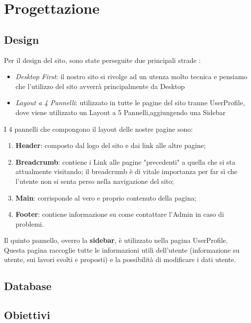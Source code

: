 \section{Progettazione}
	
  \subsection{Design}
  Per il design del sito, sono state perseguite due principali strade :
  \begin{itemize}
    \item \textit{Desktop First}: il nostro sito si rivolge ad un utenza molto tecnica e pensiamo che l'utilizzo del sito avverrà principalmente da Desktop
    \item \textit{Layout a 4 Pannelli}: utilizzato in tutte le pagine del sito tranne UserProfile, dove viene utilizzato un Layout a 5 Pannelli,aggiungendo una Sidebar
  \end{itemize}
  
  I 4 pannelli che compongono il layout delle nostre pagine sono:
  \begin{enumerate}
    \item \textbf{Header}: composto dal logo del sito e dai link alle altre pagine;
    \item \textbf{Breadcrumb}: contiene i Link alle pagine "precedenti" a quella che si sta attualmente visitando; il breadcrumb è di vitale importanza per far sì che l'utente
      non si senta perso nella navigazione del sito;
    \item \textbf{Main}: corrisponde al vero e proprio contenuto della pagina;
    \item \textbf{Footer}: contiene informazione su come contattare l'Admin in caso di problemi.
  \end{enumerate}

  Il quinto pannello, overro la \textbf{sidebar}, è utilizzato nella pagina UserProfile. 
  Questa pagina raccoglie tutte le informazioni utili dell'utente (informazione su utente, sui lavori svolti e proposti) e la possibilità di modificare i dati utente.


  \subsection{Database}




  \subsection{Obiettivi}
  